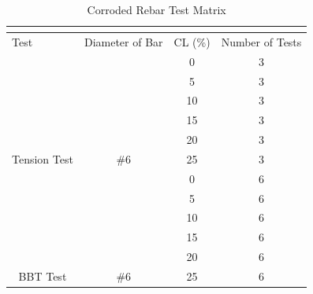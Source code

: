 \begin{table}[]
	\caption{Corroded Rebar Test Matrix}
	\label{tab:Test Matrix}
	\centering	
	\begin{tabular}{|c|c|c|c|}
	\hline
	\multicolumn{4}{|c|}{\cellcolor[HTML]{CC0000}{\color[HTML]{FFFFFF} Corroded BBT Test Matrix}}                                               \\ \hline
	\multicolumn{1}{|l|}{Test}     & \multicolumn{1}{l|}{Diameter of Bar} & \multicolumn{1}{l|}{CL (\%)} & \multicolumn{1}{l|}{Number of Tests} \\ \hline
	                               &                                      & 0                            & 3                                    \\ \cline{3-4} 
	                               &                                      & 5                            & 3                                    \\ \cline{3-4} 
	                               &                                      & 10                           & 3                                    \\ \cline{3-4} 
	                               &                                      & 15                           & 3                                    \\ \cline{3-4} 
	                               &                                      & 20                           & 3                                    \\ \cline{3-4} 
	\multirow{-6}{*}{Tension Test} & \multirow{-6}{*}{\#6}                & 25                           & 3                                    \\ \hline
	                               &                                      & 0                            & 6                                    \\ \cline{3-4} 
	                               &                                      & 5                            & 6                                    \\ \cline{3-4} 
	                               &                                      & 10                           & 6                                    \\ \cline{3-4} 
	                               &                                      & 15                           & 6                                    \\ \cline{3-4} 
	                               &                                      & 20                           & 6                                    \\ \cline{3-4} 
	\multirow{-6}{*}{BBT Test}     & \multirow{-6}{*}{\#6}                & 25                           & 6                                    \\ \hline
	\end{tabular}
\end{table}
